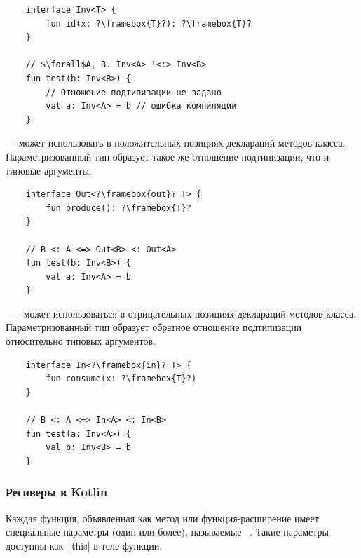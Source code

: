 \begin{verbatim}
    interface Inv<T> {
        fun id(x: ?\framebox{T}?): ?\framebox{T}?
    }

    // $\forall$A, B. Inv<A> !<:> Inv<B>
    fun test(b: Inv<B>) {
        // Отношение подтипизации не задано
        val a: Inv<A> = b // ошибка компиляции
    }
\end{verbatim}

\begin{definition}
    \label{def:covariant}
     --- может использовать в положительных позициях деклараций методов класса.
    Параметризованный тип образует такое же отношение подтипизации, что и типовые аргументы.
\end{definition}

\begin{verbatim}
    interface Out<?\framebox{out}? T> {
        fun produce(): ?\framebox{T}?
    }

    // B <: A <=> Out<B> <: Out<A>
    fun test(b: Inv<B>) {
        val a: Inv<A> = b
    }
\end{verbatim}

\begin{definition}
    \label{def:contravariant}
    ~--- может использоваться в отрицательных позициях деклараций методов класса.
    Параметризованный тип образует обратное отношение подтипизации относительно типовых аргументов.
\end{definition}

\begin{verbatim}
    interface In<?\framebox{in}? T> {
        fun consume(x: ?\framebox{T}?)
    }

    // B <: A <=> In<A> <: In<B>
    fun test(a: Inv<A>) {
        val b: Inv<B> = b
    }
\end{verbatim}

\subsubsection{Ресиверы в Kotlin}

\begin{definition}
    \label{def:receivers}
    Каждая функция, объявленная как метод или функция-расширение имеет специальные параметры (один или более), называемые ~\cite{akhin2021kotlin}.
    Такие параметры доступны как \texttt|this| в теле функции.
\end{definition}

